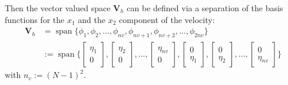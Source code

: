 \documentclass[a4paper,10pt,BCOR=15mm]{scrbook}
\DeclareMathOperator{\spann}{span}
\begin{document}
Then the vector valued space $\mathbf V_h$ can be defined via a separation of the basis functions for the $x_1$ and the $x_2$ component of the velocity:
\begin{equation} \label{canspli}
 \begin{split}
   \mathbf V_h &= \spann \bigl \{ \phi_1,\phi_2,\dotsc,\phi_{nv},\phi_{nv+1},\phi_{nv+2},\dotsc,\phi_{2nv} \bigr \}\\
&:=\spann \bigl \{ \begin{bmatrix} \eta_1 \\ 0 \end{bmatrix},\begin{bmatrix} \eta_2 \\ 0 \end{bmatrix},\dotsc,\begin{bmatrix} \eta_{nv} \\ 0 \end{bmatrix}, \begin{bmatrix} 0\\ \eta_1 \end{bmatrix},\begin{bmatrix} 0\\ \eta_2 \end{bmatrix},\dotsc,\begin{bmatrix} 0\\ \eta_{nv} \end{bmatrix} \bigr \}
 \end{split}
\end{equation}
with $n_v := (N-1)^2$. 
\end{document}
